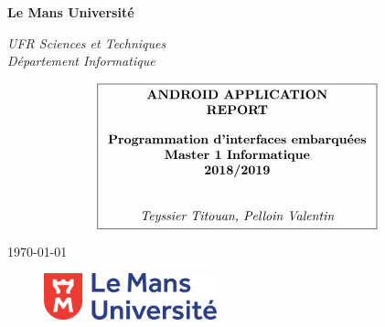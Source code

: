 \documentclass{report}
\begin{document}
\begin{titlepage}


\textbf{Le Mans Université}
\begin{flushright}
\hspace{6cm} \textit{UFR Sciences et Techniques}
\\
\textit{Département Informatique}
\end{flushright}

\vskip1cm
\begin{center}

\vspace{2cm}

$$\fbox{$
  \begin{array}{c}
  \textbf{ANDROID APPLICATION}
  \\
  \textbf{REPORT}
  \vphantom{\int_\int}
  \\
  \textbf{Programmation d'interfaces embarquées}
  \\
  \textbf{Master 1 Informatique}
  \\
  \textbf{2018/2019}
  \\
  \\
  \\
  \textit{Teyssier Titouan, Pelloin Valentin}
  \end{array}
  $}
$$
\end{center}

\vspace{2cm}

\begin{center}
   \vspace{12pt}
   \today
\end{center}

\vspace{4cm}

\begin{figure}[H]
	\centering
    \includegraphics[width=5cm]{logo.png}
\end{figure}


\end{titlepage}



\tableofcontents
\end{document}
